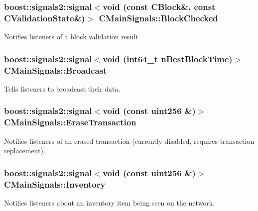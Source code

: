 \subsubsection[{Block\+Checked}]{\setlength{\rightskip}{0pt plus 5cm}boost\+::signals2\+::signal$<$void (const C\+Block\&, const {\bf C\+Validation\+State}\&)$>$ C\+Main\+Signals\+::\+Block\+Checked}\label{struct_c_main_signals_a9419bb09211f46bdc7f214e9d94f1bd7}
Notifies listeners of a block validation result \hypertarget{struct_c_main_signals_a57ba54e641838bc03d0bbda30796c0c9}{}
\subsubsection[{Broadcast}]{\setlength{\rightskip}{0pt plus 5cm}boost\+::signals2\+::signal$<$void (int64\+\_\+t n\+Best\+Block\+Time)$>$ C\+Main\+Signals\+::\+Broadcast}\label{struct_c_main_signals_a57ba54e641838bc03d0bbda30796c0c9}
Tells listeners to broadcast their data. \hypertarget{struct_c_main_signals_a1bb8e6808c2086e4045ecd8f356a12e4}{}
\subsubsection[{Erase\+Transaction}]{\setlength{\rightskip}{0pt plus 5cm}boost\+::signals2\+::signal$<$void (const {\bf uint256} \&)$>$ C\+Main\+Signals\+::\+Erase\+Transaction}\label{struct_c_main_signals_a1bb8e6808c2086e4045ecd8f356a12e4}
Notifies listeners of an erased transaction (currently disabled, requires transaction replacement). \hypertarget{struct_c_main_signals_a2f8f94d91265dc946e97614042698a7b}{}
\subsubsection[{Inventory}]{\setlength{\rightskip}{0pt plus 5cm}boost\+::signals2\+::signal$<$void (const {\bf uint256} \&)$>$ C\+Main\+Signals\+::\+Inventory}\label{struct_c_main_signals_a2f8f94d91265dc946e97614042698a7b}
Notifies listeners about an inventory item being seen on the network. \hypertarget{struct_c_main_signals_a11f2f18522ff7aa672eb5cc8c1f397b2}{}

